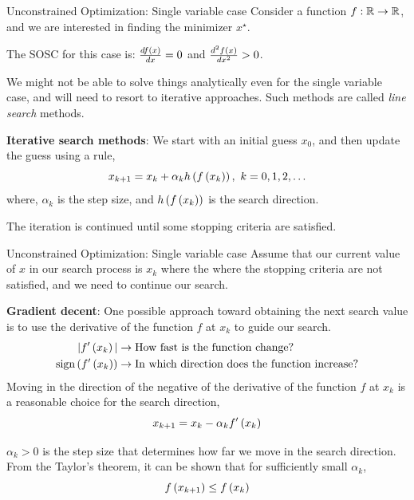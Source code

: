 \documentclass[aspectratio=169]{beamer}
\def\mb{\ensuremath\mathbb}
\def\lp{\ensuremath\left(}
\def\rp{\ensuremath\right)}
\def\R{\ensuremath\mb{R}}
\newcommand{\ct}[1]{\lp #1\rp}
\begin{document}
\begin{frame}{Unconstrained Optimization: Single variable case}
  Consider a function $f: \R \to \R$, and we are interested in finding the minimizer $x^{\star}$.
  \vspace{0.25cm}

  The SOSC for this case is: $\frac{df\ct{x}}{dx} = 0$ and $\frac{d^2f\ct{x}}{dx^2} > 0$.
  \vspace{0.25cm}

  We might not be able to solve things analytically even for the single variable case, and will need to resort to iterative approaches. Such methods are called \textit{line search} methods.
  \vspace{0.25cm}

  \textbf{Iterative search methods}: We start with an initial guess $x_0$, and then update the guess using a rule,
  \[ x_{k+1} = x_k + \alpha_k h\ct{f\ct{x_k}}, \,\, k = 0, 1, 2, \ldots \]
  where, $\alpha_k$ is the step size, and $h\ct{f\ct{x_k}}$ is the search direction.
  \vspace{0.25cm}

  The iteration is continued until some stopping criteria are satisfied.
\end{frame}


\begin{frame}{Unconstrained Optimization: Single variable case}
  Assume that our current value of $x$ in our search process is $x_k$ where the  where the stopping criteria are not satisfied, and we need to continue our search.
  \vspace{0.25cm}

  \textbf{Gradient decent}: One possible approach toward obtaining the next search value is to use the derivative of the function $f$ at $x_k$ to guide our search. 
  \[ 
    \begin{split} 
    \vert f'\ct{x_k}\vert &\rightarrow \text{How fast is the function change?} \\
    \text{sign}\ct{f'\ct{x_k}} &\rightarrow \text{In which direction does the function increase?} \\
    \end{split}
  \]
  Moving in the direction of the negative of the derivative of the function $f$ at $x_k$ is a reasonable choice for the search direction,
  \[ x_{k+1} = x_k - \alpha_k f'\ct{x_k} \]

  $\alpha_k > 0$ is the step size that determines how far we move in the search direction. From the Taylor's theorem, it can be shown that for sufficiently small $\alpha_k$,
  \[ f\ct{x_{k+1}} \leq f\ct{x_{k}} \]
\end{frame}
\end{document}
